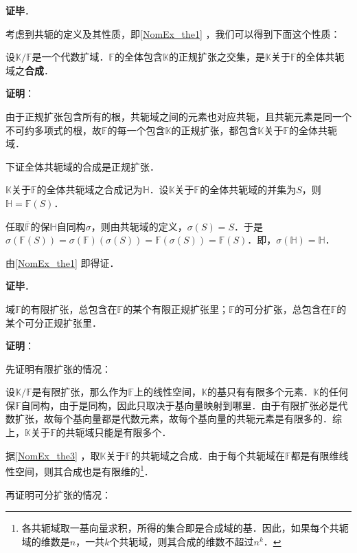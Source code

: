 \textbf{证毕}．


考虑到共轭的定义及其性质，即\autoref{NomEx_the1} ，我们可以得到下面这个性质：

\begin{theorem}{}\label{NomEx_the3}
设$\mathbb{K}/\mathbb{F}$是一个代数扩域．$\mathbb{F}$的全体包含$\mathbb{K}$的正规扩张之交集，是$\mathbb{K}$关于$\mathbb{F}$的全体共轭域之\textbf{合成}．
\end{theorem}

\textbf{证明}：

由于正规扩张包含所有的根，共轭域之间的元素也对应共轭，且共轭元素是同一个不可约多项式的根，故$\mathbb{F}$的每一个包含$\mathbb{K}$的正规扩张，都包含$\mathbb{K}$关于$\mathbb{F}$的全体共轭域．

下证全体共轭域的合成是正规扩张．

$\mathbb{K}$关于$\mathbb{F}$的全体共轭域之合成记为$\mathbb{H}$．设$\mathbb{K}$关于$\mathbb{F}$的全体共轭域的并集为$S$，则$\mathbb{H}=\mathbb{F}(S)$．

任取$\overline{\mathbb{F}}$的保$\mathbb{H}$自同构$\sigma$，则由共轭域的定义，$\sigma(S)=S$．于是$\sigma(\mathbb{F}(S))=\sigma(\mathbb{F})(\sigma(S))=\mathbb{F}(\sigma(S))=\mathbb{F}(S)$．即，$\sigma(\mathbb{H})=\mathbb{H}$．

由\autoref{NomEx_the1} 即得证．

\textbf{证毕}．


\begin{theorem}{}\label{NomEx_the4}
域$\mathbb{F}$的有限扩张，总包含在$\mathbb{F}$的某个有限正规扩张里；$\mathbb{F}$的可分扩张，总包含在$\mathbb{F}$的某个可分正规扩张里．
\end{theorem}

\textbf{证明}：

先证明有限扩张的情况：

设$\mathbb{K}/\mathbb{F}$是有限扩张，那么作为$\mathbb{F}$上的线性空间，$\mathbb{K}$的基只有有限多个元素．$\mathbb{K}$的任何保$\mathbb{F}$自同构，由于是同构，因此只取决于基向量映射到哪里．由于有限扩张必是代数扩张，故每个基向量都是代数元素，故每个基向量的共轭元素是有限多的．综上，$\mathbb{K}$关于$\mathbb{F}$的共轭域只能是有限多个．

据\autoref{NomEx_the3} ，取$\mathbb{K}$关于$\mathbb{F}$的共轭域之合成．由于每个共轭域在$\mathbb{F}$都是有限维线性空间，则其合成也是有限维的\footnote{各共轭域取一基向量求积，所得的集合即是合成域的基．因此，如果每个共轭域的维数是$n$，一共$k$个共轭域，则其合成的维数不超过$n^k$．}．

再证明可分扩张的情况：

